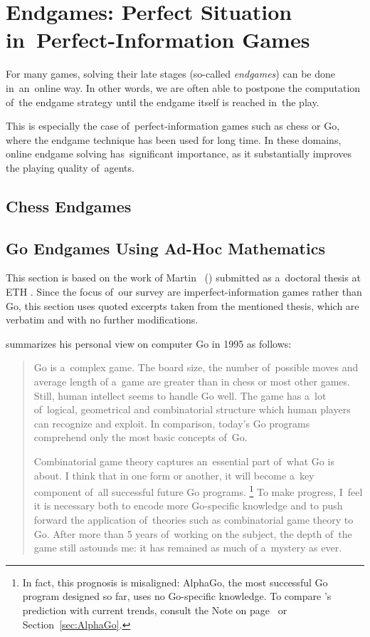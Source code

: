 \chapter{Endgames: Perfect Situation in~Perfect-Information Games}

For many games, solving their late stages (so-called \emph{endgames}) can be done in~an~online way.
In other words, we are often able to postpone the computation of~the endgame strategy until the endgame itself is reached in~the play.

This is especially the case of~perfect-information games such as chess or Go, where the endgame technique has been used for long time.
In these domains, online endgame solving has~significant importance, as it substantially improves the playing quality of~agents.

\section{Chess Endgames}
\todo

\section{Go Endgames Using Ad-Hoc Mathematics}

This section is based on the work of Martin~\Mueller{} (\cite{Muller1995computer}) submitted as a~doctoral thesis at ETH \Zurich.
Since the focus of~our survey are imperfect-information games rather than Go, this section uses quoted excerpts taken from the mentioned thesis, which are verbatim and with no further modifications.

\Mueller{} summarizes his personal view on computer Go in 1995 as follows:
\begin{quotation}
  Go is a~complex game.
  The board size, the number of~possible moves and average length of a~game are greater than in chess or most other games.
  Still, human intellect seems to handle Go well.
  The game has a~lot of~logical, geometrical and combinatorial structure which human players can recognize and exploit.
  In comparison, today’s Go programs comprehend only the most basic concepts of~Go.

  Combinatorial game theory captures an~essential part of~what Go is about.
  I think that in one form or another, it will become a~key component of~all successful future Go programs.%
  \footnote{
    In fact, this prognosis is misaligned:
    AlphaGo, the most successful Go program designed so far, uses no Go-specific knowledge.
    To compare \Mueller's prediction with current trends, consult the Note on page~\pageref{note:CGTvsAlphaGo} or Section~\ref{sec:AlphaGo}.
  }
  To make progress, I~feel it is necessary both to encode more Go-specific knowledge and to push forward the application of~theories such as combinatorial game theory to Go.
  After more than 5 years of~working on the subject, the depth of~the game still astounds me:
  it has remained as much of a~mystery as ever.
\end{quotation}

